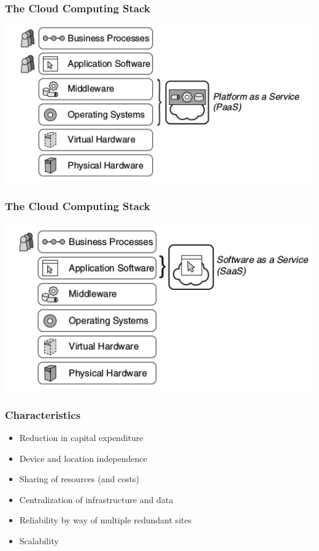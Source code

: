\documentclass{beamer}
\begin{document}
\begin{frame}

\frametitle{The Cloud Computing Stack}
\begin{center}
\includegraphics[width=\textwidth]{PaaS}
\end{center}

\end{frame}

\begin{frame}

\frametitle{The Cloud Computing Stack}
\begin{center}
\includegraphics[width=\textwidth]{SaaS}
\end{center}

\end{frame}

\begin{frame}
\frametitle{Characteristics}
\begin{itemize}
\item Reduction in capital expenditure
\item Device and location independence
\item Sharing of resources (and costs)
\item Centralization of infrastructure and data
\item Reliability by way of multiple redundant sites
\item Scalability

\end{itemize}

\end{frame}
\end{document}
